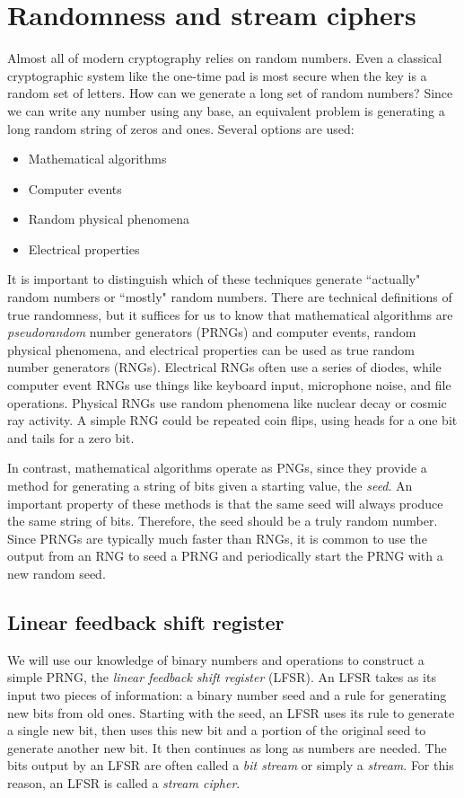 \documentclass{book}
\theoremstyle{plain}
\theoremstyle{definition}
\begin{document}
\chapter{Randomness and stream ciphers}
Almost all of modern cryptography relies on random numbers. Even a classical cryptographic system like the one-time pad is most secure when the key is a random set of letters. How can we generate a long set of random numbers? Since we can write any number using any base, an equivalent problem is generating a long random string of zeros and ones. Several options are used:
\begin{itemize}
\item Mathematical algorithms
\item Computer events
\item Random physical phenomena
\item Electrical properties
\end{itemize}
It is important to distinguish which of these techniques generate ``actually" random numbers or ``mostly" random numbers. There are technical definitions of true randomness, but it suffices for us to know that mathematical algorithms are {\it pseudorandom} number generators (PRNGs) and computer events, random physical phenomena, and electrical properties can be used as true random number generators (RNGs). Electrical RNGs often use a series of diodes, while computer event RNGs use things like keyboard input, microphone noise, and file operations. Physical RNGs use random phenomena like nuclear decay or cosmic ray activity. A simple RNG could be repeated coin flips, using heads for a one bit and tails for a zero bit.

In contrast, mathematical algorithms operate as PNGs, since they provide a method for generating a string of bits given a starting value, the {\it seed}. An important property of these methods is that the same seed will always produce the same string of bits. Therefore, the seed should be a truly random number. Since PRNGs are typically much faster than RNGs, it is common to use the output from an RNG to seed a PRNG and periodically start the PRNG with a new random seed.

\section{Linear feedback shift register}
We will use our knowledge of binary numbers and operations to construct a simple PRNG, the {\it linear feedback shift register} (LFSR). An LFSR takes as its input two pieces of information: a binary number seed and a rule for generating new bits from old ones. Starting with the seed, an LFSR uses its rule to generate a single new bit, then uses this new bit and a portion of the original seed to generate another new bit. It then continues as long as numbers are needed. The bits output by an LFSR are often called a {\it bit stream} or simply a {\it stream}. For this reason, an LFSR is called a {\it stream cipher}.
\end{document}
